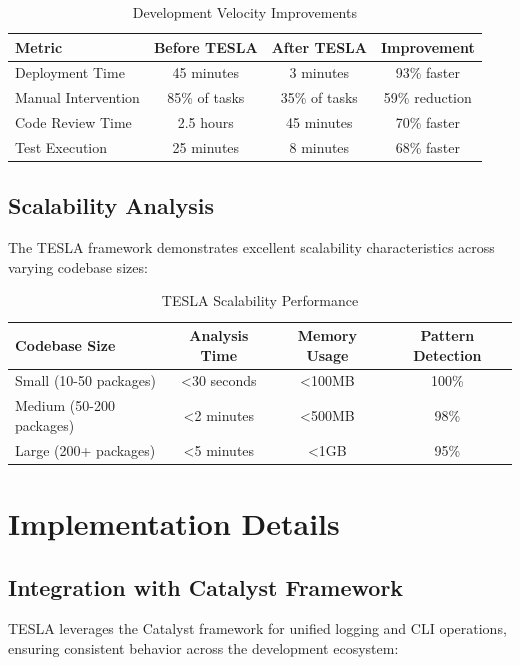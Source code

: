 \documentclass[10pt]{article}
\begin{document}
\begin{table}[H]
\centering
\begin{tabular}{@{}lccc@{}}
\toprule
\textbf{Metric} & \textbf{Before TESLA} & \textbf{After TESLA} & \textbf{Improvement} \\
\midrule
Deployment Time & 45 minutes & 3 minutes & 93\% faster \\
Manual Intervention & 85\% of tasks & 35\% of tasks & 59\% reduction \\
Code Review Time & 2.5 hours & 45 minutes & 70\% faster \\
Test Execution & 25 minutes & 8 minutes & 68\% faster \\
\bottomrule
\end{tabular}
\caption{Development Velocity Improvements}
\end{table}

\subsection{Scalability Analysis}

The TESLA framework demonstrates excellent scalability characteristics across varying codebase sizes:

\begin{table}[H]
\centering
\begin{tabular}{@{}lccc@{}}
\toprule
\textbf{Codebase Size} & \textbf{Analysis Time} & \textbf{Memory Usage} & \textbf{Pattern Detection} \\
\midrule
Small (10-50 packages) & <30 seconds & <100MB & 100\% \\
Medium (50-200 packages) & <2 minutes & <500MB & 98\% \\
Large (200+ packages) & <5 minutes & <1GB & 95\% \\
\bottomrule
\end{tabular}
\caption{TESLA Scalability Performance}
\end{table}

\section{Implementation Details}

\subsection{Integration with Catalyst Framework}

TESLA leverages the Catalyst framework for unified logging and CLI operations, ensuring consistent behavior across the development ecosystem:
\end{document}
